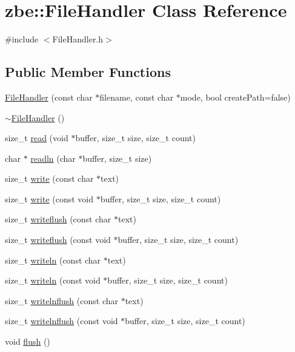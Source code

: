 \hypertarget{classzbe_1_1_file_handler}{}\section{zbe\+:\+:File\+Handler Class Reference}
\label{classzbe_1_1_file_handler}


{\ttfamily \#include $<$File\+Handler.\+h$>$}

\subsection*{Public Member Functions}
\begin{DoxyCompactItemize}
\item 
\hyperlink{classzbe_1_1_file_handler_afd7d7207a3bfc6295dde9a478c77b0e5}{File\+Handler} (const char $\ast$filename, const char $\ast$mode, bool create\+Path=false)
\item 
\hyperlink{classzbe_1_1_file_handler_a48d9b38cf1de51c80e990f3b0f2e79f4}{$\sim$\+File\+Handler} ()
\item 
size\+\_\+t \hyperlink{classzbe_1_1_file_handler_a3410ba3e6b68c848a7da77aec020cc32}{read} (void $\ast$buffer, size\+\_\+t size, size\+\_\+t count)
\item 
char $\ast$ \hyperlink{classzbe_1_1_file_handler_a8a1f0e0239e0876a665fd7bc0f6c5334}{readln} (char $\ast$buffer, size\+\_\+t size)
\item 
size\+\_\+t \hyperlink{classzbe_1_1_file_handler_acdb16ed40cd778f23d1d1246ffce47c9}{write} (const char $\ast$text)
\item 
size\+\_\+t \hyperlink{classzbe_1_1_file_handler_a43df606f64a33c739973d27ee246ed2f}{write} (const void $\ast$buffer, size\+\_\+t size, size\+\_\+t count)
\item 
size\+\_\+t \hyperlink{classzbe_1_1_file_handler_a7b929b91cb770dda64367135ef572369}{writeflush} (const char $\ast$text)
\item 
size\+\_\+t \hyperlink{classzbe_1_1_file_handler_adee1df5194be8d59da5fe821d1270991}{writeflush} (const void $\ast$buffer, size\+\_\+t size, size\+\_\+t count)
\item 
size\+\_\+t \hyperlink{classzbe_1_1_file_handler_ab1f25f337fa383209d8ed8f9c6421e95}{writeln} (const char $\ast$text)
\item 
size\+\_\+t \hyperlink{classzbe_1_1_file_handler_a47a02501308c7d7ec86bae4079f8b779}{writeln} (const void $\ast$buffer, size\+\_\+t size, size\+\_\+t count)
\item 
size\+\_\+t \hyperlink{classzbe_1_1_file_handler_a09ec7d2128ef86f67333e9dd3a693ac4}{writelnflush} (const char $\ast$text)
\item 
size\+\_\+t \hyperlink{classzbe_1_1_file_handler_addc9aed59f56b5f26bb35feb5db2c632}{writelnflush} (const void $\ast$buffer, size\+\_\+t size, size\+\_\+t count)
\item 
void \hyperlink{classzbe_1_1_file_handler_aed585d5a4fd962bcaa350c915dd69e6f}{flush} ()
\end{DoxyCompactItemize}
